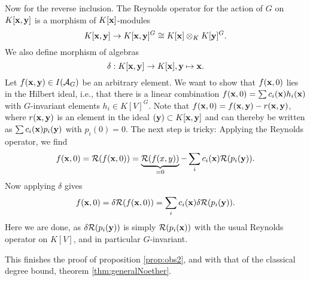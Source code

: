 \documentclass[../main.tex]{subfiles}
\begin{document}
Now for the reverse inclusion. The Reynolds operator for the action of $G$ on 
$K[\mathbf{x} ,\mathbf{y}]$ is a morphism of $K[\mathbf{x}]$-modules
\begin{equation*}
    K[\mathbf{x},\mathbf{y}] \to K[\mathbf{x}, \mathbf{y}]^G \cong K[\mathbf{x}] \otimes_K K[\mathbf{y}]^G.
\end{equation*}
We also define morphism of algebras
\begin{equation*}
    \delta: K[\mathbf{x},\mathbf{y}] \to K[\mathbf{x}], \mathbf{y} \mapsto \mathbf{x}.
\end{equation*}
Let $f(\mathbf{x},\mathbf{y}) \in I(\mathcal{A}_G)$ be an arbitrary element. We want to show that 
$f(\mathbf{x},0)$ lies in the Hilbert ideal, i.e., that there is a linear combination
$f(\mathbf{x}, 0) = \sum c_i(\mathbf{x}) h_i(\mathbf{x})$ with $G$-invariant elements $h_i \in K[V]^G$. 
Note that $f(\mathbf{x},0) = f(\mathbf{x},\mathbf{y}) - r(\mathbf{x},\mathbf{y})$, where $r(\mathbf{x},\mathbf{y})$ is an element
in the ideal $(\mathbf{y}) \subset K[\mathbf{x},\mathbf{y}]$ and can thereby be written as $\sum
c_i(\mathbf{x})p_i(\mathbf{y})$ with $p_i(0) = 0$. The next step is tricky: Applying the
Reynolds operator, we find 
\begin{equation*}
    f(\mathbf{x}, 0) = \mathcal{R}(f(\mathbf{x},0)) = \underbrace{\mathcal{R}(f(x,y))}_{=0} - \sum_i c_i(\mathbf{x})
    \mathcal{R}(p_i(\mathbf{y})).
\end{equation*}
Now applying $\delta$ gives
\begin{equation*}
    f(\mathbf{x},0) = \delta \mathcal{R}(f(\mathbf{x},0)) = \sum_i c_i(\mathbf{x}) \delta \mathcal{R}(p_i(\mathbf{y})).
\end{equation*}
Here we are done, as $\delta \mathcal{R}(p_i(\mathbf{y}))$ is simply $\mathcal{R}(p_i(\mathbf{x}))$ with the 
usual Reynolds operator on $K[V]$, and in particular $G$-invariant. 

This finishes the proof of proposition \ref{prop:obs2}, and with that of the
classical degree bound, theorem \ref{thm:generalNoether}.
\end{document}
